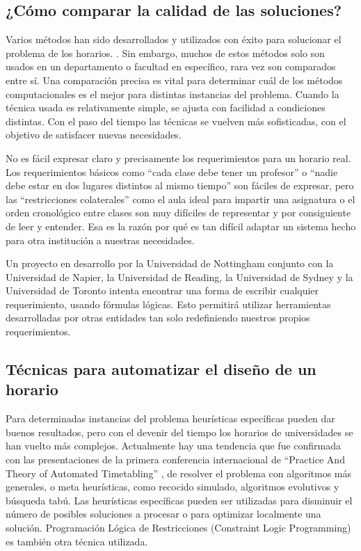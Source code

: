 \subsection{¿Cómo comparar la calidad de las soluciones?}

Varios métodos han sido desarrollados y utilizados con éxito para solucionar el problema de los horarios.
\cite{VA Bardadym, MW Carter, MW Carter and G Laporte, JH Kingston}. Sin embargo, muchos de estos métodos 
solo son usados en un departamento o facultad en específico, rara vez son comparados entre sí. Una 
comparación precisa es vital para determinar cuál de los métodos computacionales es el mejor para
distintas instancias del problema. Cuando la técnica usada es relativamente simple, se ajusta con facilidad
a condiciones distintas. Con el paso del tiempo las técnicas se vuelven más sofisticadas, con el objetivo
de satisfacer nuevas necesidades.

No es fácil expresar claro y precisamente los requerimientos para un horario real. Los requerimientos básicos
como ``cada clase debe tener un profesor'' o ``nadie debe estar en dos lugares distintos al mismo tiempo'' son
fáciles de expresar, pero las ``restricciones colaterales'' como el aula ideal para impartir una asignatura o
el orden cronológico entre clases son muy difíciles de representar y por consiguiente de leer y entender. Esa
es la razón por qué es tan difícil adaptar un sistema hecho para otra institución a nuestras necesidades.

Un proyecto en desarrollo por la Universidad de Nottingham conjunto con la Universidad de Napier, la Universidad
de Reading, la Universidad de Sydney y la Universidad de Toronto intenta encontrar una forma de escribir cualquier
requerimiento, usando fórmulas lógicas. Esto permitirá utilizar herramientas desarrolladas por otras entidades tan
solo redefiniendo nuestros propios requerimientos.

\subsection{Técnicas para automatizar el diseño de un horario}

Para determinadas instancias del problema heurísticas específicas pueden dar buenos resultados, pero con el devenir del tiempo los horarios de universidades se han vuelto más complejos. Actualmente hay una tendencia que fue confirmada
con las presentaciones de la primera conferencia internacional de ``Practice And Theory of Automated Timetabling''
\cite{D Abramson and J Abela}, de resolver el problema con algoritmos más generales, o meta heurísticas, como
recocido simulado, algoritmos evolutivos y búsqueda tabú. Las heurísticas específicas pueden ser utilizadas
para disminuir el número de posibles soluciones a procesar o para optimizar localmente una solución. Programación
Lógica de Restricciones (Constraint Logic Programming) es también otra técnica utilizada.

